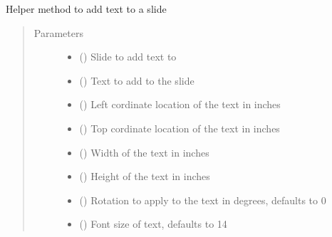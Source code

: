 \documentclass[letterpaper,10pt,english]{sphinxmanual}
\begin{document}
\begin{fulllineitems}
\begin{fulllineitems}
\label{\detokenize{polo.utils:polo.utils.io_utils.PptxWriter.add_text_to_slide}}
Helper method to add text to a slide
\begin{quote}\begin{description}
\item[{Parameters}] \leavevmode\begin{itemize}
\item {} 
 () \textendash{} Slide to add text to

\item {} 
 () \textendash{} Text to add to the slide

\item {} 
 () \textendash{} Left cordinate location of the text in inches

\item {} 
 () \textendash{} Top cordinate location of the text in inches

\item {} 
 () \textendash{} Width of the text in inches

\item {} 
 () \textendash{} Height of the text in inches

\item {} 
 (\sphinxstyleliteralemphasis{\sphinxupquote{, }}) \textendash{} Rotation to apply to the text in degrees, defaults to 0

\item {} 
 (\sphinxstyleliteralemphasis{\sphinxupquote{, }}) \textendash{} Font size of text, defaults to 14


\end{itemize}
\end{description}
\end{quote}
\end{fulllineitems}
\end{fulllineitems}
\end{document}
